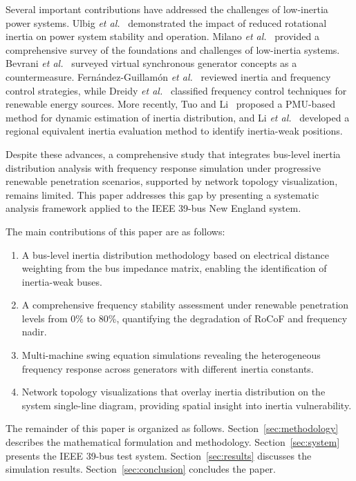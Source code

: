 \documentclass[]{ieeeaccess}
\begin{document}
Several important contributions have addressed the challenges of low-inertia power systems. Ulbig \textit{et al.}~\cite{ulbig2014} demonstrated the impact of reduced rotational inertia on power system stability and operation. Milano \textit{et al.}~\cite{milano2018} provided a comprehensive survey of the foundations and challenges of low-inertia systems. Bevrani \textit{et al.}~\cite{bevrani2014} surveyed virtual synchronous generator concepts as a countermeasure. Fern\'{a}ndez-Guillam\'{o}n \textit{et al.}~\cite{fernandez2019} reviewed inertia and frequency control strategies, while Dreidy \textit{et al.}~\cite{dreidy2017} classified frequency control techniques for renewable energy sources. More recently, Tuo and Li~\cite{tuo2021} proposed a PMU-based method for dynamic estimation of inertia distribution, and Li \textit{et al.}~\cite{li2024} developed a regional equivalent inertia evaluation method to identify inertia-weak positions.

Despite these advances, a comprehensive study that integrates bus-level inertia distribution analysis with frequency response simulation under progressive renewable penetration scenarios, supported by network topology visualization, remains limited. This paper addresses this gap by presenting a systematic analysis framework applied to the IEEE 39-bus New England system.

The main contributions of this paper are as follows:
\begin{enumerate}
    \item A bus-level inertia distribution methodology based on electrical distance weighting from the bus impedance matrix, enabling the identification of inertia-weak buses.
    \item A comprehensive frequency stability assessment under renewable penetration levels from 0\% to 80\%, quantifying the degradation of RoCoF and frequency nadir.
    \item Multi-machine swing equation simulations revealing the heterogeneous frequency response across generators with different inertia constants.
    \item Network topology visualizations that overlay inertia distribution on the system single-line diagram, providing spatial insight into inertia vulnerability.
\end{enumerate}

The remainder of this paper is organized as follows. Section~\ref{sec:methodology} describes the mathematical formulation and methodology. Section~\ref{sec:system} presents the IEEE 39-bus test system. Section~\ref{sec:results} discusses the simulation results. Section~\ref{sec:conclusion} concludes the paper.
\end{document}
